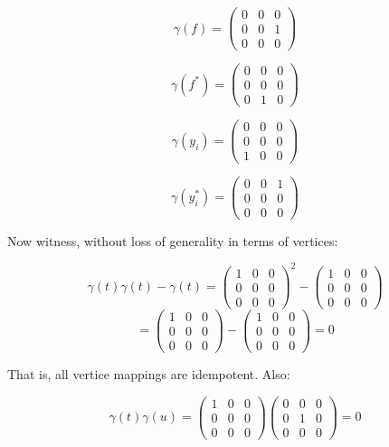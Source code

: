 \begin{solution}
    $$\gamma(f)=\left(\begin{array}{ccc} 0 & 0 & 0 \\ 0 & 0 & 1 \\ 0 & 0 & 0 \end{array}\right)$$

    $$\gamma(f^*)=\left(\begin{array}{ccc} 0 & 0 & 0 \\ 0 & 0 & 0 \\ 0 & 1 & 0 \end{array}\right)$$

    $$\gamma(y_i)=\left(\begin{array}{ccc} 0 & 0 & 0 \\ 0 & 0 & 0 \\ 1 & 0 & 0 \end{array}\right)$$

    $$\gamma(y_i^*)=\left(\begin{array}{ccc} 0 & 0 & 1 \\ 0 & 0 & 0 \\ 0 & 0 & 0 \end{array}\right)$$

    Now witness, without loss of generality in terms of vertices:

    $$\gamma(t)\gamma(t)-\gamma(t)
    =\left(\begin{array}{ccc} 1 & 0 & 0 \\ 0 & 0 & 0 \\ 0 & 0 & 0 \end{array}\right)^2
    -\left(\begin{array}{ccc} 1 & 0 & 0 \\ 0 & 0 & 0 \\ 0 & 0 & 0 \end{array}\right)$$
    $$=\left(\begin{array}{ccc} 1 & 0 & 0 \\ 0 & 0 & 0 \\ 0 & 0 & 0 \end{array}\right)-
    \left(\begin{array}{ccc} 1 & 0 & 0 \\ 0 & 0 & 0 \\ 0 & 0 & 0 \end{array}\right)=0$$

    That is, all vertice mappings are idempotent. Also:

    $$\gamma(t)\gamma(u)=\left(\begin{array}{ccc} 1 & 0 & 0 \\ 0 & 0 & 0 \\ 0 & 0 & 0 \end{array}\right)
    \left(\begin{array}{ccc} 0 & 0 & 0 \\ 0 & 1 & 0 \\ 0 & 0 & 0 \end{array}\right)=0$$


\end{solution}
